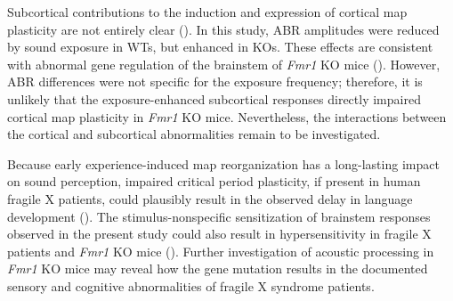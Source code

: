Subcortical contributions to the induction and expression of cortical map plasticity are not entirely clear (\cite{Barkat2011, Oliver2011, Miyakawa2013}). In this study, ABR amplitudes were reduced by sound exposure in WTs, but enhanced in KOs. These effects are consistent with abnormal gene regulation of the brainstem of \textit{Fmr1} KO mice (\cite{Strumbos2010}). However, ABR differences were not specific for the exposure frequency; therefore, it is unlikely that the exposure-enhanced subcortical responses directly impaired cortical map plasticity in \textit{Fmr1} KO mice. Nevertheless, the interactions between the cortical and subcortical abnormalities remain to be investigated.

Because early experience-induced map reorganization has a long-lasting impact on sound perception, impaired critical period plasticity, if present in human fragile X patients, could plausibly result in the observed delay in language development (\cite{Finestack2009}). The stimulus-nonspecific sensitization of brainstem responses observed in the present study could also result in hypersensitivity in fragile X patients and \textit{Fmr1} KO mice (\cite{Miller1999, Chen2001, Nielsen2002, Tsiouris2004}). Further investigation of acoustic processing in \textit{Fmr1} KO mice may reveal how the gene mutation results in the documented sensory and cognitive abnormalities of fragile X syndrome patients.

\printbibliography